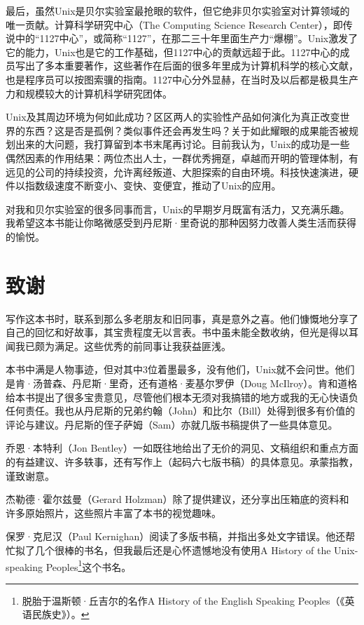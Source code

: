 \documentclass[a4paper,12pt,UTF8,twoside]{ctexbook}
\begin{document}
最后，虽然Unix是贝尔实验室最抢眼的软件，但它绝非贝尔实验室对计算领域的唯一贡献。计算科学研究中心（The Computing Science Research Center），即传说中的“1127中心”，或简称“1127”，在那二三十年里面生产力“爆棚”。Unix激发了它的能力，Unix也是它的工作基础，但1127中心的贡献远超于此。1127中心的成员写出了多本重要著作，这些著作在后面的很多年里成为计算机科学的核心文献，也是程序员可以按图索骥的指南。1127中心分外显赫，在当时及以后都是极具生产力和规模较大的计算机科学研究团体。

Unix及其周边环境为何如此成功？区区两人的实验性产品如何演化为真正改变世界的东西？这是否是孤例？类似事件还会再发生吗？关于如此耀眼的成果能否被规划出来的大问题，我打算留到本书末尾再讨论。目前我认为，Unix的成功是一些偶然因素的作用结果：两位杰出人士，一群优秀拥趸，卓越而开明的管理体制，有远见的公司的持续投资，允许离经叛道、大胆探索的自由环境。科技快速演进，硬件以指数级速度不断变小、变快、变便宜，推动了Unix的应用。

对我和贝尔实验室的很多同事而言，Unix的早期岁月既富有活力，又充满乐趣。我希望这本书能让你略微感受到丹尼斯·里奇说的那种因努力改善人类生活而获得的愉悦。

\chapter{致谢}

写作这本书时，联系到那么多老朋友和旧同事，真是意外之喜。他们慷慨地分享了自己的回忆和好故事，其宝贵程度无以言表。书中虽未能全数收纳，但光是得以耳闻我已颇为满足。这些优秀的前同事让我获益匪浅。

本书中满是人物事迹，但对其中3位着墨最多，没有他们，Unix就不会问世。他们是肯·汤普森、丹尼斯·里奇，还有道格·麦基尔罗伊（Doug McIlroy）。肯和道格给本书提出了很多宝贵意见，尽管他们根本无须对我搞错的地方或我的无心快语负任何责任。我也从丹尼斯的兄弟约翰（John）和比尔（Bill）处得到很多有价值的评论与建议。丹尼斯的侄子萨姆（Sam）亦就几版书稿提供了一些具体意见。

乔恩·本特利（Jon Bentley）一如既往地给出了无价的洞见、文稿组织和重点方面的有益建议、许多轶事，还有写作上（起码六七版书稿）的具体意见。承蒙指教，谨致谢意。

杰勒德·霍尔兹曼（Gerard Holzman）除了提供建议，还分享出压箱底的资料和许多原始照片，这些照片丰富了本书的视觉趣味。

保罗·克尼汉（Paul Kernighan）阅读了多版书稿，并指出多处文字错误。他还帮忙拟了几个很棒的书名，但我最后还是心怀遗憾地没有使用A History of the Unix-speaking Peoples\footnote{脱胎于温斯顿·丘吉尔的名作A History of the English Speaking Peoples（《英语民族史》）。}这个书名。
\end{document}
